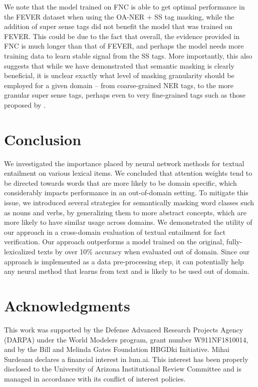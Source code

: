 \documentclass[11pt,a4paper]{article}
\begin{document}
We note that the model trained on FNC is able to get optimal performance in the FEVER dataset when using the OA-NER + SS tag masking, while the addition of super sense tags did not benefit the model that was trained on FEVER.  
This could be due to the fact that overall, the evidence provided in FNC is much longer than that of FEVER,
and perhaps the model needs more training data to learn stable signal from the SS tags. 
More importantly, this also suggests that while we have demonstrated that semantic masking is clearly beneficial, it is unclear exactly what level of masking granularity should be employed for a given domain -- from coarse-grained NER tags, to the more granular super sense tags, perhaps even to very fine-grained tags such as those proposed by \citet{ling2012fine}.

\section{Conclusion}

We investigated the importance placed by neural network methods for textual entailment on various lexical items. We concluded that attention weights tend to be directed towards words that are more likely to be domain specific, which 
considerably impacts performance in an out-of-domain setting. 
To mitigate this issue, we introduced several strategies for semantically masking word classes such as nouns and verbs, by generalizing them to more abstract concepts, which are more likely to have similar usage across domains. 
We demonstrated the utility of our approach in a cross-domain evaluation of textual entailment for fact verification. Our approach outperforms a model trained on the original, fully-lexicalized texts by over 10\% accuracy when evaluated out of domain. 
Since our approach is implemented as a data pre-processing step, it can potentially help any neural method that learns from text and is likely to be used out of domain. 


\section*{Acknowledgments}

This work was supported by the Defense Advanced Research Projects Agency
(DARPA) under the World Modelers program, grant number
W911NF1810014, and by the Bill and Melinda
Gates Foundation HBGDki Initiative.
Mihai Surdeanu declares a financial interest in lum.ai. This interest has been properly disclosed to the University of Arizona Institutional Review Committee and is managed in accordance with its conflict of interest policies.




\end{document}
